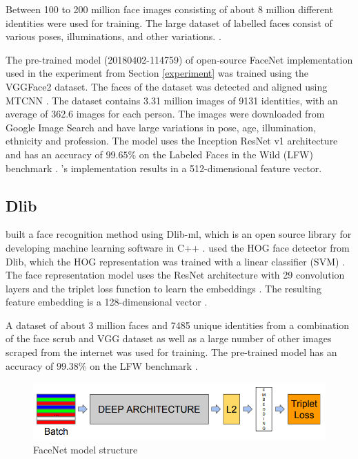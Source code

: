 \documentclass[12pt,english]{article}
\begin{document}
Between 100 to 200 million face images consisting of about 8 million different identities were used for training. The large dataset of labelled faces consist of various poses, illuminations, and other variations. \cite{schroff}.

The pre-trained model (20180402-114759) of open-source FaceNet implementation \cite{sandberg} used in the experiment from Section \ref{experiment} was trained using the VGGFace2 dataset. The faces of the dataset was detected and aligned using MTCNN . The dataset contains 3.31 million images of 9131 identities, with an average of 362.6 images for each person. The images were downloaded from Google Image Search and have large variations in pose, age, illumination, ethnicity and profession. The model uses the Inception ResNet v1 architecture and has an accuracy of $99.65\%$ on the Labeled Faces in the Wild (LFW) benchmark \cite{sandberg}. \cite{sandberg}'s implementation results in a 512-dimensional feature vector.

\subsection{Dlib}
\quad
\cite{geitgey} built a face recognition method using Dlib-ml, which is an open source library for developing machine learning software in C++ \cite{king}. \cite{geitgey} used the HOG face detector from Dlib, which the HOG representation was trained with a linear classifier (SVM) \cite{king2014}. The face representation model uses the ResNet architecture with 29 convolution layers and the triplet loss function to learn the embeddings \cite{king2017}. The resulting feature embedding is a 128-dimensional vector \cite{king2017}. 

A dataset of about 3 million faces and 7485 unique identities from a combination of the face scrub and VGG dataset as well as a large number of other images scraped from the internet was used for training. The pre-trained model has an accuracy of $99.38\%$ on the LFW benchmark \cite{king2017}.

\begin{figure}[!tbp]
 \centering
    \includegraphics[width=\textwidth]{figures/facenet_model_archi.png}
    \caption{FaceNet model structure \cite{amos}}
	\label{fig:facemodel}
\end{figure}
\end{document}

